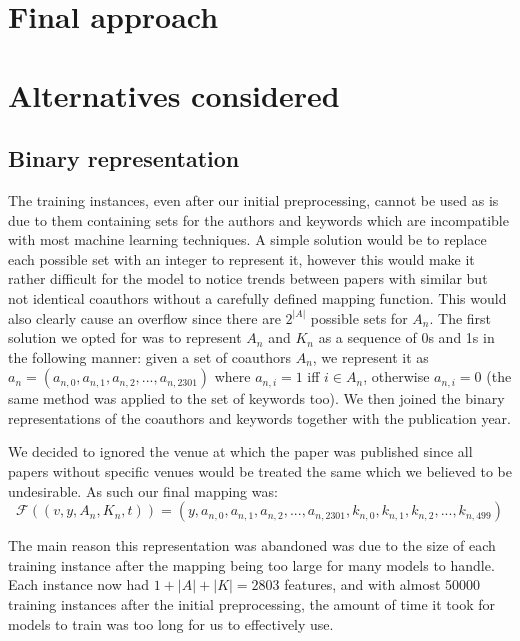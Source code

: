 \documentclass[11pt]{article}
\begin{document}
\section{Final approach}


\section{Alternatives considered}

\subsection{Binary representation}

The training instances, even after our initial preprocessing, cannot be used as is due to them containing sets for the authors and keywords which are incompatible with most machine learning techniques. A simple solution would be to replace each possible set with an integer to represent it, however this would make it rather difficult for the model to notice trends between papers with similar but not identical coauthors without a carefully defined mapping function. This would also clearly cause an overflow since there are $2^{|A|}$ possible sets for $A_n$. The first solution we opted for was to represent $A_n$ and $K_n$ as a sequence of 0s and 1s in the following manner: given a set of coauthors $A_n$, we represent it as $a_n=(a_{n,0}, a_{n,1}, a_{n,2}, ..., a_{n,2301})$ where $a_{n,i}=1$ iff $i \in A_n$, otherwise $a_{n,i}=0$ (the same method was applied to the set of keywords too). We then joined the binary representations of the coauthors and keywords together with the publication year.


We decided to ignored the venue at which the paper was published since all papers without specific venues would be treated the same which we believed to be undesirable. As such our final mapping was: 
\begin{equation*}
	\mathcal{F}((v, y, A_n, K_n, t)) = (y, a_{n,0}, a_{n,1}, a_{n,2}, ..., a_{n,2301}, k_{n,0}, k_{n,1}, k_{n,2}, ..., k_{n,499})
\end{equation*}


The main reason this representation was abandoned was due to the size of each training instance after the mapping being too large for many models to handle. Each instance now had $1+|A|+|K| = 2803$ features, and with almost 50000 training instances after the initial preprocessing, the amount of time it took for models to train was too long for us to effectively use.
\end{document}
